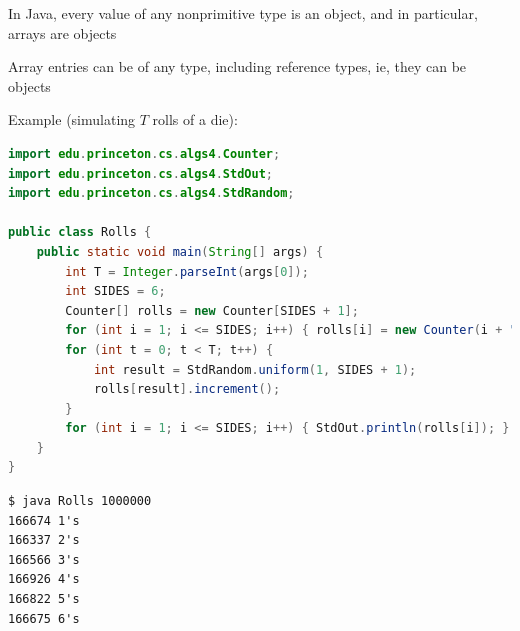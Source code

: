 \documentclass[8pt,a4paper,compress]{beamer}
\begin{document}
\begin{frame}[fragile]
In Java, every value of any nonprimitive type is an object, and in particular, arrays are objects 

\bigskip

Array entries can be of any type, including reference types, ie, they can be objects

\bigskip

Example (simulating $T$ rolls of a die):

\begin{lstlisting}[language=Java]
import edu.princeton.cs.algs4.Counter;
import edu.princeton.cs.algs4.StdOut;
import edu.princeton.cs.algs4.StdRandom;

public class Rolls {
    public static void main(String[] args) {
        int T = Integer.parseInt(args[0]);
        int SIDES = 6;
        Counter[] rolls = new Counter[SIDES + 1];
        for (int i = 1; i <= SIDES; i++) { rolls[i] = new Counter(i + "'s"); }
        for (int t = 0; t < T; t++) {
            int result = StdRandom.uniform(1, SIDES + 1);
            rolls[result].increment();
        }
        for (int i = 1; i <= SIDES; i++) { StdOut.println(rolls[i]); }
    }
}
\end{lstlisting}

\begin{lstlisting}[language={}]
$ java Rolls 1000000
166674 1's
166337 2's
166566 3's
166926 4's
166822 5's
166675 6's
\end{lstlisting}
\end{frame}
\end{document}
